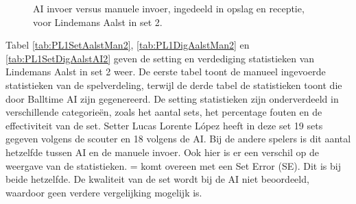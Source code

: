 \begin{figure}[ht]
\centering
{}
\caption{AI invoer versus manuele invoer, ingedeeld in opslag en receptie, voor Lindemans Aalst in set 2.}
\label{fig:PL1ServeReceiveAalst2}
\end{figure}

Tabel \ref{tab:PL1SetAalstMan2}, \ref{tab:PL1DigAalstMan2} en \ref{tab:PL1SetDigAalstAI2} geven de setting en verdediging statistieken van Lindemans Aalst in set 2 weer. De eerste tabel toont de manueel ingevoerde statistieken van de spelverdeling, terwijl de derde tabel de statistieken toont die door Balltime AI zijn gegenereerd. De setting statistieken zijn onderverdeeld in verschillende categorieën, zoals het aantal sets, het percentage fouten en de effectiviteit van de set. Setter Lucas Lorente López heeft in deze set 19 sets gegeven volgens de scouter en 18 volgens de AI. Bij de andere spelers is dit aantal hetzelfde tussen AI en de manuele invoer. Ook hier is er een verschil op de weergave van de statistieken. = komt overeen met een Set Error (SE). Dit is bij beide hetzelfde. De kwaliteit van de set wordt bij de AI niet beoordeeld, waardoor geen verdere vergelijking mogelijk is.

